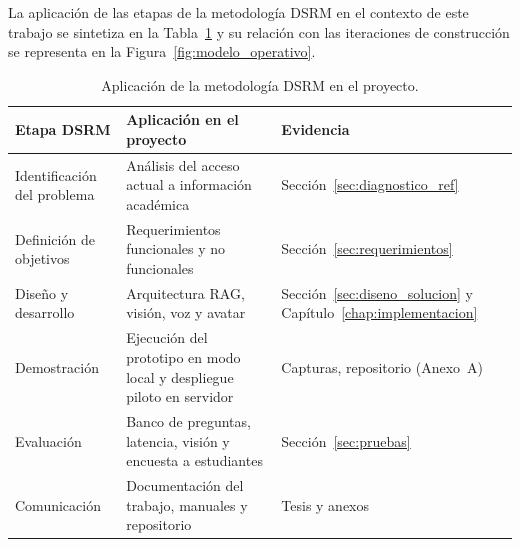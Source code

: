 La aplicación de las etapas de la metodología DSRM en el contexto de este trabajo se sintetiza en la Tabla~\ref{tab:dsrm} y su relación con las iteraciones de construcción se representa en la Figura~\ref{fig:modelo_operativo}.

\begin{table}[H]
  \caption{Aplicación de la metodología DSRM en el proyecto.}
  \label{tab:dsrm}
\centering
\small
\setlength{\tabcolsep}{4pt}
\renewcommand{\arraystretch}{1.25}
\begin{tabular}{|>{\raggedright\arraybackslash}p{3.5cm}|>{\raggedright\arraybackslash}p{5.8cm}|>{\raggedright\arraybackslash}p{3.4cm}|}
\hline
\rowcolor[HTML]{EFEFEF}
\textbf{Etapa DSRM} & \textbf{Aplicación en el proyecto} & \textbf{Evidencia} \\ \hline
Identificación del problema & Análisis del acceso actual a información académica & Sección~\ref{sec:diagnostico_ref} \\ \hline
Definición de objetivos & Requerimientos funcionales y no funcionales & Sección~\ref{sec:requerimientos} \\ \hline
Diseño y desarrollo & Arquitectura RAG, visión, voz y avatar & Sección~\ref{sec:diseno_solucion} y Capítulo~\ref{chap:implementacion} \\ \hline
Demostración & Ejecución del prototipo en modo local y despliegue piloto en servidor & Capturas, repositorio (Anexo~A) \\ \hline
Evaluación & Banco de preguntas, latencia, visión y encuesta a estudiantes & Sección~\ref{sec:pruebas} \\ \hline
Comunicación & Documentación del trabajo, manuales y repositorio & Tesis y anexos \\ \hline
\end{tabular}
\elaboradopor{\autorTFG}
\end{table}

